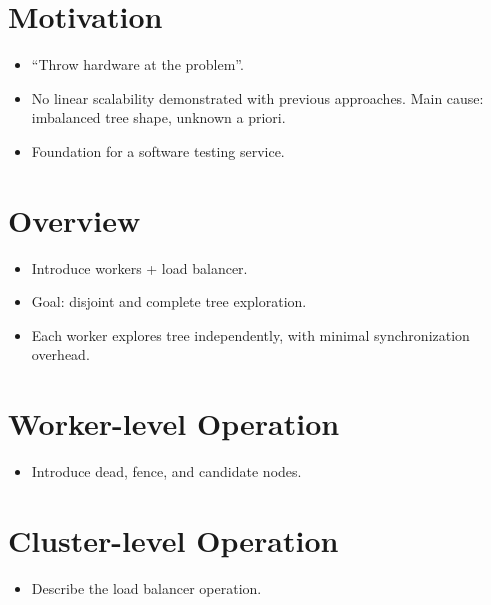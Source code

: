 \section{Motivation}

\begin{itemize}
\item ``Throw hardware at the problem''.
\item No linear scalability demonstrated with previous approaches. Main cause: imbalanced tree shape, unknown a priori.
\item Foundation for a software testing service.
\end{itemize}


\section{Overview}

\begin{itemize}
\item Introduce workers + load balancer.
\item Goal: disjoint and complete tree exploration.
\item Each worker explores tree independently, with minimal synchronization overhead.
\end{itemize}


\section{Worker-level Operation}

\begin{itemize}
\item Introduce dead, fence, and candidate nodes.
\end{itemize}


\section{Cluster-level Operation}

\begin{itemize}
\item Describe the load balancer operation.
\end{itemize}

